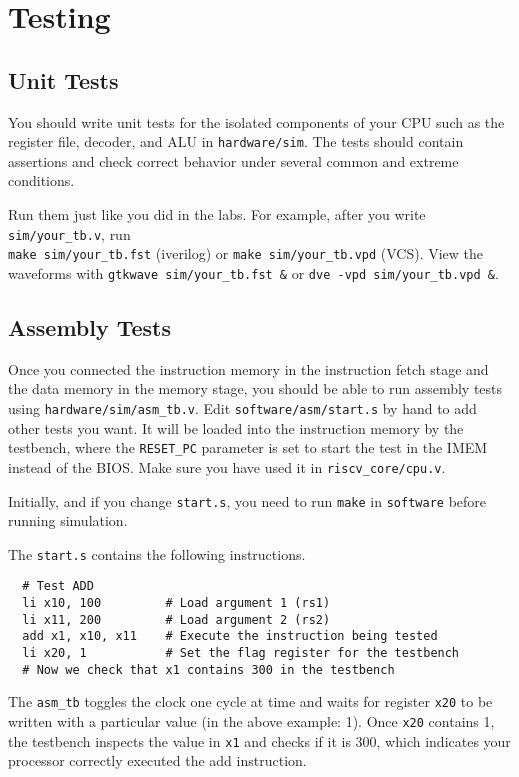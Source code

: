 \section{Testing} \label{sec:testing}
\subsection{Unit Tests}
You should write unit tests for the isolated components of your CPU
such as the register file, decoder, and ALU in \verb|hardware/sim|.
The tests should contain assertions and check correct behavior
under several common and extreme conditions.

Run them just like you did in the labs.
For example, after you write \verb|sim/your_tb.v|, run \\
\verb|make sim/your_tb.fst| (iverilog) or \verb|make sim/your_tb.vpd| (VCS).
View the waveforms with \verb|gtkwave sim/your_tb.fst &| or \verb|dve -vpd sim/your_tb.vpd &|.

\subsection{Assembly Tests}
Once you connected the instruction memory in the instruction fetch stage and the data memory in the memory stage,
you should be able to run assembly tests using \verb|hardware/sim/asm_tb.v|.
Edit \verb|software/asm/start.s| by hand to add other tests you want.
It will be loaded into the instruction memory by the testbench,
where the \verb|RESET_PC| parameter is set to start the test in the IMEM instead of the BIOS.
Make sure you have used it in \verb|riscv_core/cpu.v|.

Initially, and if you change \verb|start.s|, you need to run \verb|make| in \verb|software|
before running simulation.

The \verb|start.s| contains the following instructions.
\begin{verbatim}
  # Test ADD
  li x10, 100         # Load argument 1 (rs1)
  li x11, 200         # Load argument 2 (rs2)
  add x1, x10, x11    # Execute the instruction being tested
  li x20, 1           # Set the flag register for the testbench
  # Now we check that x1 contains 300 in the testbench
\end{verbatim}
The \verb|asm_tb| toggles the clock one cycle at time and waits for register \verb|x20|
to be written with a particular value (in the above example: 1).
Once \verb|x20| contains 1, the testbench inspects the value in \verb|x1|
and checks if it is 300, which indicates your processor correctly executed the add instruction.

